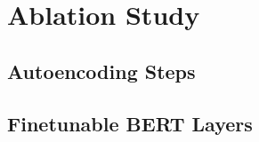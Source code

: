 \section{Ablation Study}


\subsection{Autoencoding Steps}



\subsection{Finetunable BERT Layers}







% 






